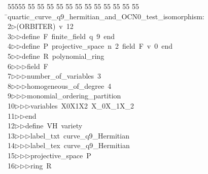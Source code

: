 %
%
\begin{tabbing}
55555 \= 55 \= 55 \= 55 \= 55 \= 55 \= 55 \= 55 \= 55 \= 55 \= 55 \= 55 \= 55 \= \>quartic\_curve\_q9\_hermitian\_and\_OCN0\_test\_isomorphism:\\[0pt]
2\>$\triangleright$\>(ORBITER)\ v\ 12\ \\[0pt]
3\>$\triangleright$\>$\triangleright$\>define\ F\ finite\_field\ q\ 9\ end\ \\[0pt]
4\>$\triangleright$\>$\triangleright$\>define\ P\ projective\_space\ n\ 2\ field\ F\ v\ 0\ end\ \\[0pt]
5\>$\triangleright$\>$\triangleright$\>define\ R\ polynomial\_ring\ \\[0pt]
6\>$\triangleright$\>$\triangleright$\>$\triangleright$\>field\ F\ \\[0pt]
7\>$\triangleright$\>$\triangleright$\>$\triangleright$\>number\_of\_variables\ 3\ \\[0pt]
8\>$\triangleright$\>$\triangleright$\>$\triangleright$\>homogeneous\_of\_degree\ 4\ \\[0pt]
9\>$\triangleright$\>$\triangleright$\>$\triangleright$\>monomial\_ordering\_partition\ \\[0pt]
10\>$\triangleright$\>$\triangleright$\>$\triangleright$\>variables\ X0X1X2\ X\_0X\_1X\_2\ \\[0pt]
11\>$\triangleright$\>$\triangleright$\>end\ \\[0pt]
12\>$\triangleright$\>$\triangleright$\>define\ VH\ variety\ \\[0pt]
13\>$\triangleright$\>$\triangleright$\>$\triangleright$\>label\_txt\ curve\_q9\_Hermitian\ \\[0pt]
14\>$\triangleright$\>$\triangleright$\>$\triangleright$\>label\_tex\ curve\_q9\_Hermitian\ \\[0pt]
15\>$\triangleright$\>$\triangleright$\>$\triangleright$\>projective\_space\ P\ \\[0pt]
16\>$\triangleright$\>$\triangleright$\>$\triangleright$\>ring\ R\ \\[0pt]

\end{tabbing}
